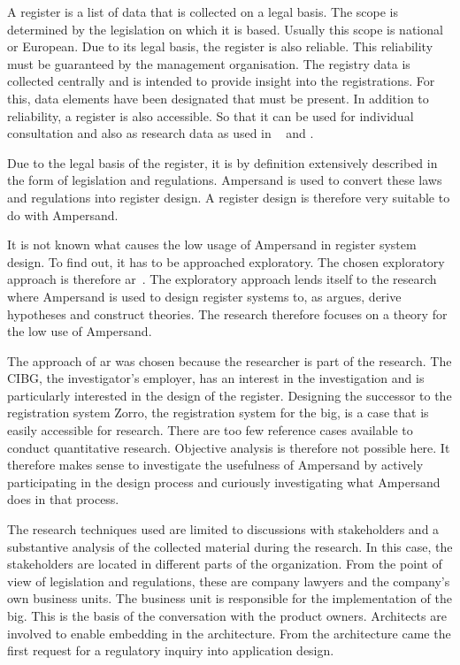 A register is a list of data that is collected on a legal basis.
The scope is determined by the legislation on which it is based.
Usually this scope is national or European.
Due to its legal basis, the register is also reliable.
This reliability must be guaranteed by the management organisation.
The registry data is collected centrally and is intended to provide insight into the registrations.
For this, data elements have been designated that must be present.
In addition to reliability, a register is also accessible.
So that it can be used for individual consultation and also as research data as used in ~\cite{schmidt_danish_2015} and \cite{bakken_norwegian_2019}.

Due to the legal basis of the register, it is by definition extensively described in the form of legislation and regulations.
Ampersand is used to convert these laws and regulations into register design.
A register design is therefore very suitable to do with Ampersand.

It is not known what causes the low usage of Ampersand in register system design.
To find out, it has to be approached exploratory.
The chosen exploratory approach is therefore \acrfull{ar}~\citep{Easterbrook}.
The exploratory approach lends itself to the research where Ampersand is used to design register systems to, as \cite{Easterbrook} argues, derive hypotheses and construct theories.
The research therefore focuses on a theory for the low use of Ampersand.

The approach of \acrshort{ar} was chosen because the researcher is part of the research.
The CIBG, the investigator's employer, has an interest in the investigation and is particularly interested in the design of the register.
Designing the successor to the registration system Zorro, the registration system for the \acrshort{big}, is a case that is easily accessible for research.
There are too few reference cases available to conduct quantitative research.
Objective analysis is therefore not possible here.
It therefore makes sense to investigate the usefulness of Ampersand by actively participating in the design process and curiously investigating what Ampersand does in that process.

The research techniques used are limited to discussions with stakeholders and a substantive analysis of the collected material during the research.
In this case, the stakeholders are located in different parts of the organization.
From the point of view of legislation and regulations, these are company lawyers and the company's own business units.
The business unit is responsible for the implementation of the \acrshort{big}.
This is the basis of the conversation with the product owners.
Architects are involved to enable embedding in the architecture.
From the architecture came the first request for a regulatory inquiry into application design.

